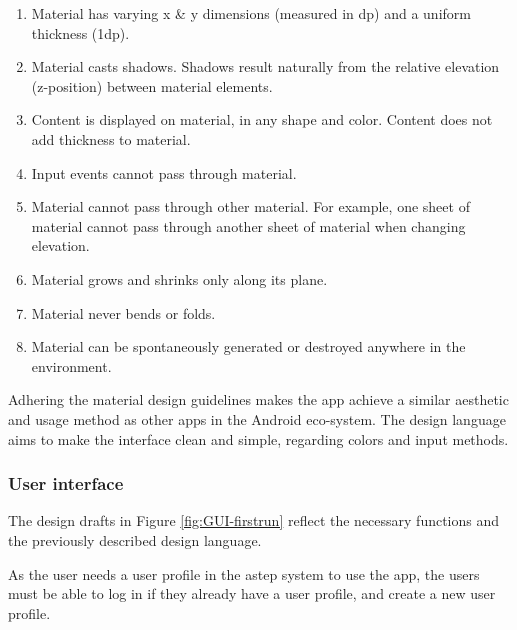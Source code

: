 \begin{enumerate}
	\item Material has varying x \& y dimensions (measured in dp) and a uniform thickness (1dp).
	\item Material casts shadows. Shadows result naturally from the relative elevation (z-position) between material elements.
	\item Content is displayed on material, in any shape and color. Content does not add thickness to material.
	\item Input events cannot pass through material.
	\item Material cannot pass through other material. For example, one sheet of material cannot pass through another sheet of material when changing elevation.
	\item Material grows and shrinks only along its plane.
	\item Material never bends or folds.
	\item Material can be spontaneously generated or destroyed anywhere in the environment.
\end{enumerate} 

Adhering the material design guidelines makes the app achieve a similar aesthetic and usage method as other apps in the Android eco-system. 
The design language aims to make the interface clean and simple, regarding colors and input methods.

\subsubsection{User interface}
The design drafts in Figure \ref{fig:GUI-firstrun} reflect the necessary functions and the previously described design language. 

As the user needs a user profile in the \gls{astep} system to use the app, the users must be able to log in if they already have a user profile, and create a new user profile.

